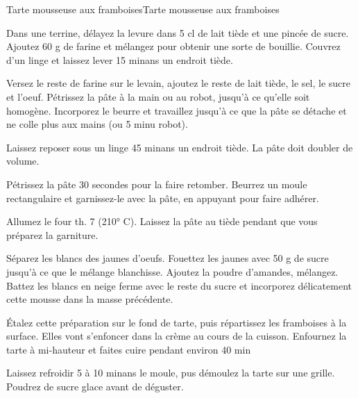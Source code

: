 \begin{recette}{Tarte mousseuse aux framboises}{Tarte mousseuse aux framboises}
\begin{etapes}
\item Dans une terrine, délayez la levure dans 5 cl de lait tiède et une pincée de sucre. Ajoutez 60 g de farine et mélangez pour obtenir une sorte de bouillie. Couvrez d’un linge et laissez lever 15 minans un endroit tiède.
\item Versez le reste de farine sur le levain, ajoutez le reste de lait tiède, le sel, le sucre et l’oeuf. Pétrissez la pâte à la main ou au robot, jusqu’à ce qu’elle soit homogène. Incorporez le beurre et travaillez jusqu’à ce que la pâte se détache et ne colle plus aux mains (ou 5 minu robot).
\item Laissez reposer sous un linge 45 minans un endroit tiède. La pâte doit doubler de volume.
\item Pétrissez la pâte 30 secondes pour la faire retomber. Beurrez un moule rectangulaire et garnissez-le avec la pâte, en appuyant pour faire adhérer.
\item Allumez le four th. 7 (210° C). Laissez la pâte au tiède pendant que vous préparez la garniture.
\item Séparez les blancs des jaunes d’oeufs. Fouettez les jaunes avec 50 g de sucre jusqu’à ce que le mélange blanchisse. Ajoutez la poudre d’amandes, mélangez. Battez les blancs en neige ferme avec le reste du sucre et incorporez délicatement cette mousse dans la masse précédente.
\item Étalez cette préparation sur le fond de tarte, puis répartissez les framboises à la surface. Elles vont s’enfoncer dans la crème au cours de la cuisson. Enfournez la tarte à mi-hauteur et faites cuire pendant environ 40 min
\item Laissez refroidir 5 à 10 minans le moule, pus démoulez la tarte sur une grille. Poudrez de sucre glace avant de déguster.
\end{etapes}

\end{recette}